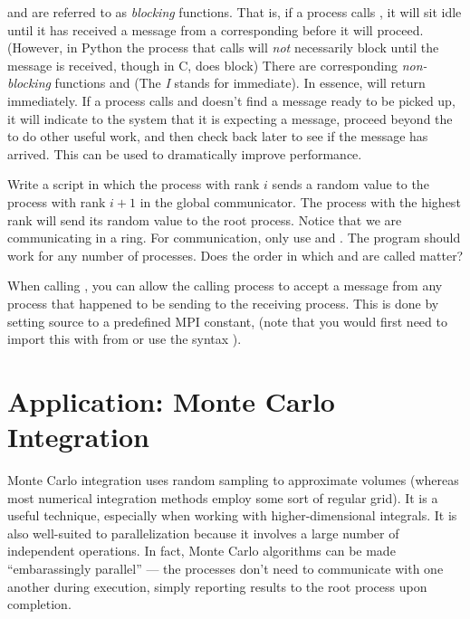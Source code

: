 \begin{info}
 and  are referred to as \emph{blocking} functions.
That is, if a process calls , it will sit idle until it has received a message from a corresponding  before it will proceed.
(However, in Python the process that calls  will \emph{not} necessarily block until the message is received, though in C,  does block)
There are corresponding \emph{non-blocking} functions  and  (The \emph{I} stands for immediate).
In essence,  will return immediately.
If a process calls  and doesn't find a message ready to be picked up, it will indicate to the system that it is expecting a message, proceed beyond the  to do other useful work, and then check back later to see if the message has arrived.
This can be used to dramatically improve performance.
\end{info}

\begin{problem}
Write a script in which the process with rank $i$ sends a random value to the process with rank $i+1$ in the global communicator.
The process with the highest rank will send its random value to the root process.
Notice that we are communicating in a ring.
For communication, only use  and .
The program should work for any number of processes.
Does the order in which  and  are called matter?
\end{problem}

\begin{info}
When calling , you can allow the calling process to accept a message from any process that happened to be sending to the receiving process.
This is done by setting source to a predefined MPI constant,  (note that you would first need to import this with from  or use the syntax ).
\end{info}

\section*{Application: Monte Carlo Integration}

Monte Carlo integration uses random sampling to approximate volumes (whereas most numerical integration methods employ some sort of regular grid).
It is a useful technique, especially when working with higher-dimensional integrals.
It is also well-suited to parallelization because it involves a large number of independent operations.
In fact, Monte Carlo algorithms can be made ``embarassingly parallel'' --- the processes don't need to communicate with one another during execution, simply reporting results to the root process upon completion.

